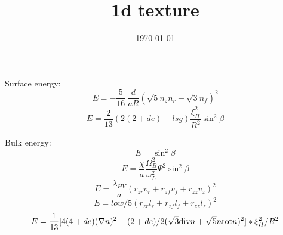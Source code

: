 \documentclass[a4paper]{article}
\begin{document}
\title{1d texture}
\date{\today}
\author{}
\maketitle

\def\sp{\sqrt{5}}
\def\st{\sqrt{3}}

Surface energy:
$$
      E = - \frac{5}{16}\ \frac{d}{aR} (\sp n_z n_r - \st n_f)^2
$$
$$
      E = \frac{2}{13} ( 2 (2+de) - lsg) \frac{\xi_H^2}{R^2} \sin^2\beta
$$

Bulk energy:
$$
      E = \sin^2\beta
$$
$$
      E = \frac{\chi}{a} \frac{\Omega^2_B}{\omega^2_L} \Psi^2 \sin^2\beta
$$
$$
      E = \frac{\lambda_{HV}}{a} (r_{zr} v_r + r_{zf} v_f + r_{zz} v_z)^2
$$
$$
      E = lo w/5 (r_{zr} l_r + r_{zf} l_f + r_{zz} l_z)^2
$$
$$
      E = \frac{1}{13} [ 4 (4+de) (\nabla n)^2
       - (2+de) / 2  (\st {\rm div} n + \sp n {\rm rot} n)^2 ] *\xi_H^2/R^2
$$
\end{document}
